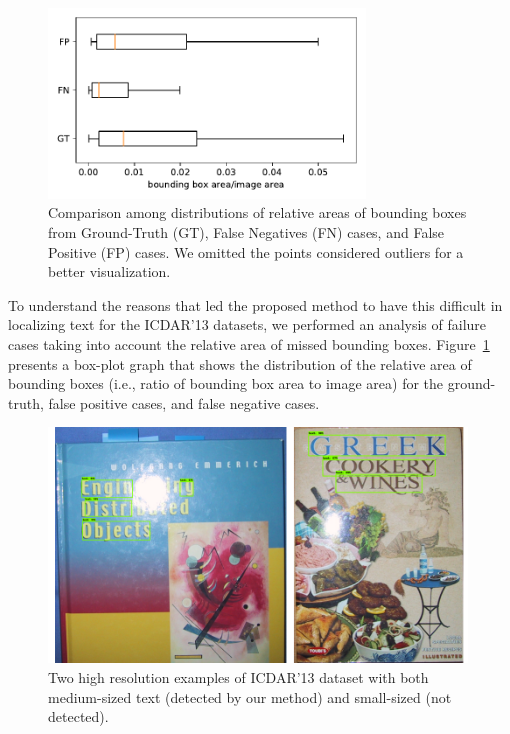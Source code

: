 \begin{figure}[!h]
    \centering
    \includegraphics[width=0.75\textwidth]{VISAPP/figs/boxplot_error_icdar13.pdf}
    \caption{Comparison among distributions of relative areas of bounding boxes from Ground-Truth (GT), False Negatives (FN) cases, and False Positive (FP) cases. We omitted the points considered outliers for a better visualization.}
    \label{fig:boxplot}
\end{figure}

To understand the reasons that led the proposed method to have this difficult in localizing text for the ICDAR'13 datasets, we performed an analysis of failure cases taking into account the relative area of missed bounding boxes. Figure~\ref{fig:boxplot} presents a box-plot graph that shows the distribution of the relative area of bounding boxes (i.e., ratio of bounding box area to image area) for the ground-truth, false positive cases, and false negative cases.

\begin{figure}[!h]
    \centering
    \includegraphics[width=0.99\textwidth]{VISAPP/figs/hires_samples.png}
    \caption{Two high resolution examples of ICDAR'13 dataset with both medium-sized text (detected by our method) and small-sized (not detected).}
    \label{fig:small_example}
\end{figure}


